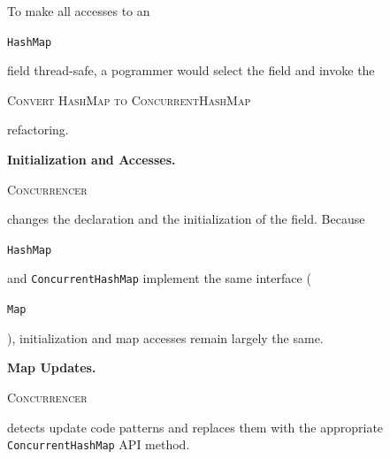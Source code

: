\documentclass[10pt,twocolumn]{article}
\newcommand{\tool}{\begin{scriptsize}\textsc{Concurrencer}\end{scriptsize}\xspace}
\newcommand{\code}[1]{\begin{smaller}\texttt{#1}\end{smaller}}
\newcommand{\codex}[1]{{\smaller\texttt{#1}}\xspace}
\newcommand{\myParagraph}[1]{\textbf{#1}}
\newcommand{\ConvertToConcurrentHashMap}{{\begin{smaller}\begin{smaller}\textsc{Convert HashMap to ConcurrentHashMap}\end{smaller}\end{smaller}}\xspace}
\newcommand{\ConcurrentHashMap}{\codex{Con\-cur\-rent\-Hash\-Map}}
\begin{document}
To make all accesses to an \code{HashMap} field
thread-safe, a pogrammer would select the field and invoke the
\ConvertToConcurrentHashMap refactoring.

\myParagraph{Initialization and Accesses.} \tool changes the declaration and the
initialization of the field. Because \code{HashMap} and
\ConcurrentHashMap implement the same interface (\code{Map}),
initialization and map accesses remain largely the same. 

\myParagraph{Map Updates.} \tool detects update code patterns and
replaces them with the appropriate \ConcurrentHashMap API method.

\end{document}
